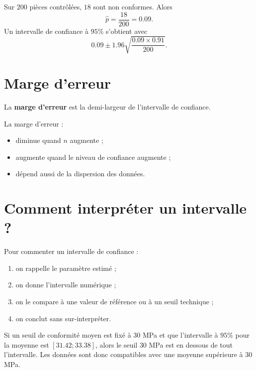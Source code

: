 \begin{Ex}
Sur $200$ pièces contrôlées, $18$ sont non conformes. Alors
$$
\widehat{p}=\frac{18}{200}=0.09.
$$
Un intervalle de confiance à $95\%$ s'obtient avec
$$
0.09 \pm 1.96 \sqrt{\frac{0.09\times 0.91}{200}}.
$$
\end{Ex}

\section{Marge d'erreur}

\begin{Def}
La \textbf{marge d'erreur} est la demi-largeur de l'intervalle de confiance.
\end{Def}

\begin{Rmq}
La marge d'erreur :
\begin{itemize}
    \item diminue quand $n$ augmente ;
    \item augmente quand le niveau de confiance augmente ;
    \item dépend aussi de la dispersion des données.
\end{itemize}
\end{Rmq}

\section{Comment interpréter un intervalle ?}

\begin{Meth}
Pour commenter un intervalle de confiance :
\begin{enumerate}
    \item on rappelle le paramètre estimé ;
    \item on donne l'intervalle numérique ;
    \item on le compare à une valeur de référence ou à un seuil technique ;
    \item on conclut sans sur-interpréter.
\end{enumerate}
\end{Meth}

\begin{Ex}
Si un seuil de conformité moyen est fixé à $30$ MPa et que l'intervalle à $95\%$ pour la moyenne est $[31.42 ; 33.38]$, alors le seuil $30$ MPa est en dessous de tout l'intervalle. Les données sont donc compatibles avec une moyenne supérieure à $30$ MPa.
\end{Ex}


